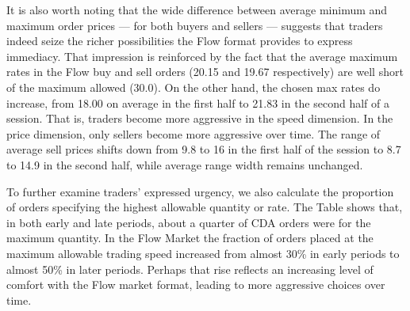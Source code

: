 \documentclass[12pt]{article}
\begin{document}
It is also worth noting that the wide difference between average minimum and maximum order prices --- for both buyers and sellers --- suggests that traders indeed seize the richer possibilities the Flow format provides to express immediacy. 
That impression is reinforced by the fact that the average maximum rates in the Flow buy and sell orders (20.15 and 19.67 respectively)
are well short of the maximum allowed (30.0).
On the other hand, the chosen max rates do increase, from 18.00 on average in the first half to 21.83 in the second half of a session. %
That is, traders become more aggressive in the speed dimension. In the price dimension, only sellers become more aggressive over time. 
The range of average sell prices shifts down from 9.8 to 16 in the first half of the session to 8.7 to 14.9 in the second half, while average range width remains unchanged.  

To further examine traders' expressed urgency, we also calculate the proportion of orders specifying the highest allowable quantity or rate. The Table shows that, in both early and late periods, about a quarter of CDA orders were for the maximum quantity.
In the Flow Market the fraction of orders placed at the maximum allowable trading speed increased from almost 30\% in early periods to almost 50\% in later periods. Perhaps that rise reflects an increasing level of comfort with the Flow market format, leading to more aggressive choices  over time.
\end{document}
